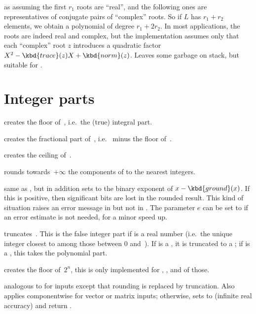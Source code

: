  as 
assuming the first $r_1$ roots are ``real'', and the following ones are
representatives of conjugate pairs of ``complex'' roots. So if $L$ has $r_1 +
r_2$ elements, we obtain a polynomial of degree $r_1 + 2r_2$. In most
applications, the roots are indeed real and complex, but the implementation
assumes only that each ``complex'' root $z$ introduces a quadratic
factor $X^2 - \kbd{trace}(z) X + \kbd{norm}(z)$.
Leaves some garbage on stack, but suitable for .

\section{Integer parts}

 creates the floor of~, i.e.\ the (true)
integral part.

 creates the fractional part of~, i.e.\ 
minus the floor of~.

 creates the ceiling of~.

 rounds towards~$+\infty$ the components of 
to the nearest integers.

 same as , but in addition sets
 to the binary exponent of $x - \kbd{ground}(x)$. If this is
positive, then significant bits are lost in the rounded result. This kind of
situation raises an error message in  but not in .
The parameter $e$ can be set to  if an error estimate is not
needed, for a minor speed up.

 truncates~. This is the false integer part
if  is a real number (i.e.~the unique integer closest to  among
those between 0 and~). If  is a , it is truncated
to a ; if  is a , this takes the polynomial part.

 creates the floor of~$2^n$, this is
only implemented for , ,  and  of
those.

 analogous to  for
 inputs except that rounding is replaced by truncation. Also applies
componentwise for vector or matrix inputs; otherwise, sets  to
 (infinite real accuracy) and return .

